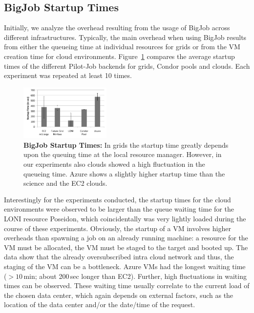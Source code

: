 \documentclass[conference,final]{IEEEtran}
\newcommand{\up}{\vspace*{-1em}}
\begin{document}
\subsection{BigJob Startup Times}
\up Initially, we analyze the overhead resulting from the usage of
BigJob across different infrastructures. Typically, the main overhead
when using BigJob results from either the queueing time at individual
resources for grids or from the VM creation time for cloud
environments.  Figure~\ref{fig:performance_setup_time} compares the
average startup times of the different Pilot-Job backends for grids,
Condor pools and clouds. Each experiment was repeated at least 10
times.

\begin{figure}[htbp]
    \centering
        \includegraphics[width=0.4\textwidth]{performance/setup-times}
    \caption{\textbf{BigJob Startup Times:} In grids the startup time
      greatly depends upon the queuing time at the local resource
      manager. However, in our experiments also clouds showed a high
      fluctuation in the queueing time. Azure shows a slightly higher
      startup time than the science and the EC2 clouds.\up}
    \label{fig:performance_setup_time}
\end{figure}

Interestingly for the experiments conducted, the startup times for the
cloud environments were observed to be larger than the queue waiting time
for the LONI resource Poseidon, which coincidentally was very lightly
loaded during the course of these experiments. Obviously, the startup
of a VM involves higher overheads than spawning a job on an already
running machine: a resource for the VM must be allocated, the VM must
be staged to the target and booted up. The data show that
the already oversubscribed intra cloud network and thus, the staging
of the VM can be a bottleneck. Azure VMs had the longest waiting time
($>10$\,min; about 200\,sec longer than EC2).
Further, high fluctuations in waiting times can be observed. These
waiting time usually correlate to the current load of the chosen data
center, which again depends on external factors, such as the location
of the data center and/or the date/time of the request.
\end{document}
